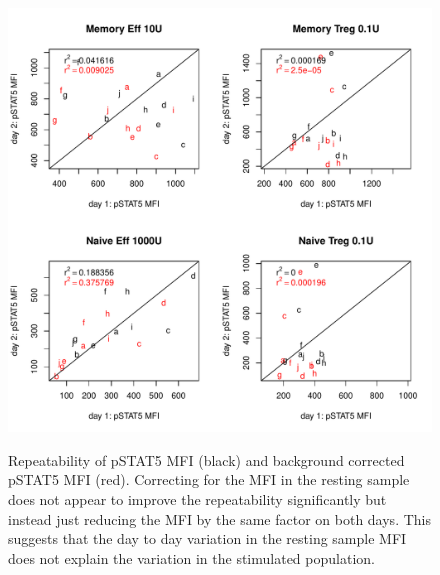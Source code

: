\chapter{\label{appendix:il2-normalisation}}

\begin{figure}
\centering
\begin{minipage}{.65\textwidth}
\includegraphics[width=\linewidth]{figures/pstat5-mfi-cellsubsets-repeatability}
\end{minipage}
\begin{minipage}{\textwidth}
{ Repeatability of pSTAT5 MFI (black) and background corrected pSTAT5 MFI (red). }
{
  Correcting for the MFI in the resting sample does not appear to improve the repeatability significantly but instead just reducing the MFI by the same factor on both days.
  This suggests that the day to day variation in the resting sample MFI does not explain the variation in the stimulated population.
}
\end{minipage}
\end{figure}



